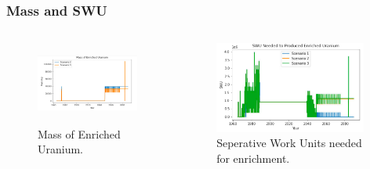 \begin{frame}
        \frametitle{Mass and SWU}
        \begin{columns}
                \column[t]{5cm}
                \begin{figure}
                        \begin{center}
                                \includegraphics[height=2.7cm]{./images/mass.png}
                        \end{center}
                                \caption{Mass of Enriched Uranium.}
                        \label{fig:mass}
                \end{figure}
                \column[t]{5cm}
                \begin{figure}[htbp!]
                        \begin{center}
                                \includegraphics[height=3cm]{./images/swu.png}
                        \end{center}
                                \caption{Seperative Work Units needed for enrichment.}
                        \label{fig:swu}
                \end{figure}
              \end{columns}
\end{frame}


